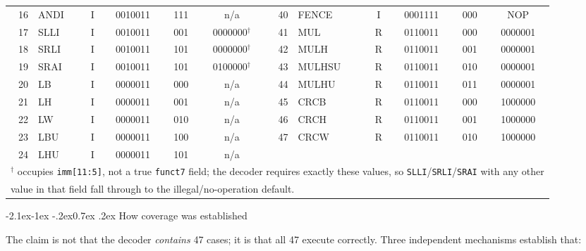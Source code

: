 \documentclass[11pt,a4paper]{article}
\makeatletter
\renewcommand\subsection{\@startsection{subsection}{2}{\z@}%
  {-2.1ex\@plus -1ex \@minus -.2ex}{0.7ex \@plus .2ex}%
  {\color{rvbldark}\normalfont\normalsize\bfseries}}
\makeatother
\begin{document}
\begin{table}[htbp]
\begin{tabular}{rlcccc<{\hspace{0.75em}}>{\hspace{0.75em}}rlcccc}
16 & ANDI   & I & 0010011 & 111 & n/a     & 40 & FENCE  & I & 0001111 & 000 & NOP \\
17 & SLLI   & I & 0010011 & 001 & 0000000$^\dagger$ & 41 & MUL    & R & 0110011 & 000 & 0000001 \\
18 & SRLI   & I & 0010011 & 101 & 0000000$^\dagger$ & 42 & MULH   & R & 0110011 & 001 & 0000001 \\
19 & SRAI   & I & 0010011 & 101 & 0100000$^\dagger$ & 43 & MULHSU & R & 0110011 & 010 & 0000001 \\
20 & LB     & I & 0000011 & 000 & n/a     & 44 & MULHU  & R & 0110011 & 011 & 0000001 \\
21 & LH     & I & 0000011 & 001 & n/a     & 45 & CRCB   & R & 0110011 & 000 & 1000000 \\
22 & LW     & I & 0000011 & 010 & n/a     & 46 & CRCH   & R & 0110011 & 001 & 1000000 \\
23 & LBU    & I & 0000011 & 100 & n/a     & 47 & CRCW   & R & 0110011 & 010 & 1000000 \\
24 & LHU    & I & 0000011 & 101 & n/a     &    &        &   &         &     & \\
\bottomrule
\multicolumn{12}{l}{\scriptsize $^\dagger$ occupies \texttt{imm[11:5]}, not a true
\texttt{funct7} field; the decoder requires exactly these values, so
\texttt{SLLI}/\texttt{SRLI}/\texttt{SRAI} with any other} \\
\multicolumn{12}{l}{\scriptsize \phantom{$^\dagger$} value in that field fall through
to the illegal/no-operation default.}
\end{tabular}
\end{table}

\subsection{How coverage was established}

The claim is not that the decoder \emph{contains} 47 cases; it is that all 47 execute
correctly. Three independent mechanisms establish that:
\end{document}
